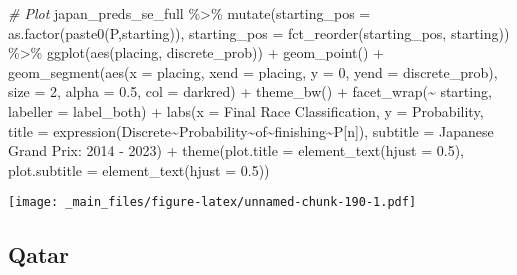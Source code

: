 \documentclass[
]{book}
\newenvironment{Shaded}{\begin{snugshade}}{\end{snugshade}}
\newcommand{\AttributeTok}[1]{\textcolor[rgb]{0.77,0.63,0.00}{#1}}
\newcommand{\CommentTok}[1]{\textcolor[rgb]{0.56,0.35,0.01}{\textit{#1}}}
\newcommand{\DecValTok}[1]{\textcolor[rgb]{0.00,0.00,0.81}{#1}}
\newcommand{\FloatTok}[1]{\textcolor[rgb]{0.00,0.00,0.81}{#1}}
\newcommand{\FunctionTok}[1]{\textcolor[rgb]{0.00,0.00,0.00}{#1}}
\newcommand{\NormalTok}[1]{#1}
\newcommand{\SpecialCharTok}[1]{\textcolor[rgb]{0.00,0.00,0.00}{#1}}
\newcommand{\StringTok}[1]{\textcolor[rgb]{0.31,0.60,0.02}{#1}}
\begin{document}
\begin{Shaded}
\begin{Highlighting}[]
\CommentTok{\# Plot}
\NormalTok{japan\_preds\_se\_full }\SpecialCharTok{\%\textgreater{}\%}
  \FunctionTok{mutate}\NormalTok{(}\AttributeTok{starting\_pos =} \FunctionTok{as.factor}\NormalTok{(}\FunctionTok{paste0}\NormalTok{(}\StringTok{\textquotesingle{}P\textquotesingle{}}\NormalTok{,starting)),}
         \AttributeTok{starting\_pos =} \FunctionTok{fct\_reorder}\NormalTok{(starting\_pos, starting)) }\SpecialCharTok{\%\textgreater{}\%}
  \FunctionTok{ggplot}\NormalTok{(}\FunctionTok{aes}\NormalTok{(placing, discrete\_prob)) }\SpecialCharTok{+}
  \FunctionTok{geom\_point}\NormalTok{() }\SpecialCharTok{+}
  \FunctionTok{geom\_segment}\NormalTok{(}\FunctionTok{aes}\NormalTok{(}\AttributeTok{x =}\NormalTok{ placing, }\AttributeTok{xend =}\NormalTok{ placing, }\AttributeTok{y =} \DecValTok{0}\NormalTok{, }\AttributeTok{yend =}\NormalTok{ discrete\_prob),}
               \AttributeTok{size =} \DecValTok{2}\NormalTok{, }\AttributeTok{alpha =} \FloatTok{0.5}\NormalTok{, }\AttributeTok{col =} \StringTok{\textquotesingle{}darkred\textquotesingle{}}\NormalTok{) }\SpecialCharTok{+}
  \FunctionTok{theme\_bw}\NormalTok{() }\SpecialCharTok{+}
  \FunctionTok{facet\_wrap}\NormalTok{(}\SpecialCharTok{\textasciitilde{}}\NormalTok{ starting, }\AttributeTok{labeller =}\NormalTok{ label\_both) }\SpecialCharTok{+}
  \FunctionTok{labs}\NormalTok{(}\AttributeTok{x =} \StringTok{\textquotesingle{}Final Race Classification\textquotesingle{}}\NormalTok{,}
       \AttributeTok{y =} \StringTok{\textquotesingle{}Probability\textquotesingle{}}\NormalTok{,}
       \AttributeTok{title =} \FunctionTok{expression}\NormalTok{(Discrete}\SpecialCharTok{\textasciitilde{}}\NormalTok{Probability}\SpecialCharTok{\textasciitilde{}}\NormalTok{of}\SpecialCharTok{\textasciitilde{}}\NormalTok{finishing}\SpecialCharTok{\textasciitilde{}}\NormalTok{P[n]),}
       \AttributeTok{subtitle =} \StringTok{\textquotesingle{}Japanese Grand Prix: 2014 {-} 2023\textquotesingle{}}\NormalTok{) }\SpecialCharTok{+}
  \FunctionTok{theme}\NormalTok{(}\AttributeTok{plot.title =} \FunctionTok{element\_text}\NormalTok{(}\AttributeTok{hjust =} \FloatTok{0.5}\NormalTok{),}
        \AttributeTok{plot.subtitle =} \FunctionTok{element\_text}\NormalTok{(}\AttributeTok{hjust =} \FloatTok{0.5}\NormalTok{)) }
\end{Highlighting}
\end{Shaded}

\texttt{[image: \_main\_files/figure-latex/unnamed-chunk-190-1.pdf]}

\hypertarget{qatar}{%
\subsection{Qatar}\label{qatar}}
\end{document}
